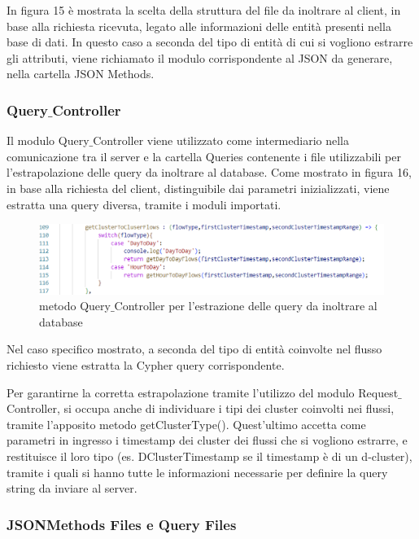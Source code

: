 In figura 15 è mostrata la scelta della struttura del file da inoltrare al client, in base alla richiesta ricevuta, legato alle informazioni delle entità presenti nella base di dati.
In questo caso a seconda del tipo di entità di cui si vogliono estrarre gli attributi, viene richiamato il modulo corrispondente al JSON da generare, nella cartella JSON Methods.

\subsubsection{Query$\_$Controller}
Il modulo Query$\_$Controller viene utilizzato come intermediario nella comunicazione tra il server e la cartella Queries contenente i file utilizzabili per l'estrapolazione delle query da inoltrare al database.
Come mostrato in figura 16, in base alla richiesta del client, distinguibile dai parametri inizializzati, viene estratta una query diversa, tramite i moduli importati.

\begin{figure}[H]
    \centering \includegraphics[keepaspectratio=true,scale=0.5]{Images/ExampleQueryControllerMethod.png}
    \caption{metodo Query$\_$Controller per l'estrazione delle query da inoltrare al database}
\end{figure}
\thispagestyle{mystyle}
Nel caso specifico mostrato, a seconda del tipo di entità coinvolte nel flusso richiesto viene estratta la Cypher query corrispondente. 

Per garantirne la corretta estrapolazione tramite l'utilizzo del modulo Request$\_$Controller, si occupa anche di individuare i tipi dei cluster coinvolti nei flussi, tramite l'apposito metodo getClusterType().
Quest'ultimo accetta come parametri in ingresso i timestamp dei cluster dei flussi che si vogliono estrarre, e restituisce il loro tipo 
(es. DClusterTimestamp se il timestamp è di un d-cluster), tramite i quali si hanno tutte le informazioni necessarie per definire la query string da inviare al server.
\subsubsection{JSONMethods Files e Query Files}

